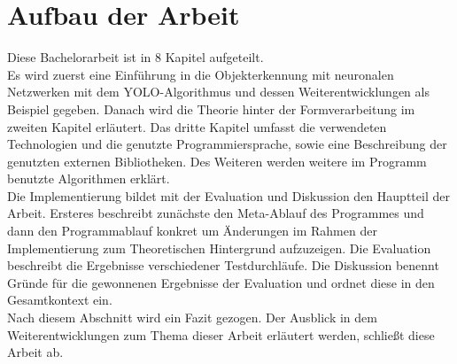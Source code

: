 \section{Aufbau der Arbeit}  \label{sec:Aufbau_Arbeit}
{Diese Bachelorarbeit ist in 8 Kapitel aufgeteilt. \\ 
Es wird zuerst eine Einführung in die Objekterkennung mit neuronalen Netzwerken mit dem YOLO-Algorithmus und dessen Weiterentwicklungen als Beispiel gegeben. Danach wird die Theorie hinter der Formverarbeitung im zweiten Kapitel erläutert. Das dritte Kapitel umfasst die verwendeten Technologien und die genutzte Programmiersprache, sowie eine Beschreibung der genutzten externen Bibliotheken. Des Weiteren werden weitere im Programm benutzte Algorithmen erklärt. \\
Die Implementierung bildet mit der Evaluation und Diskussion den Hauptteil der Arbeit. Ersteres beschreibt zunächste den Meta-Ablauf des Programmes und dann den Programmablauf konkret um Änderungen im Rahmen der Implementierung zum Theoretischen Hintergrund aufzuzeigen. Die Evaluation beschreibt die Ergebnisse verschiedener Testdurchläufe. Die Diskussion benennt Gründe für die gewonnenen Ergebnisse der Evaluation und ordnet diese in den Gesamtkontext ein. \\
Nach diesem Abschnitt wird ein Fazit gezogen. Der Ausblick in dem Weiterentwicklungen zum Thema dieser Arbeit erläutert werden, schließt diese Arbeit ab.

}




